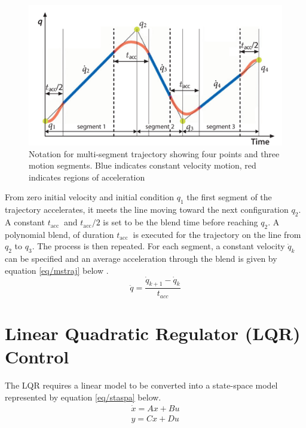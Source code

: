 \documentclass{UoNMCHA}
\numberwithin{equation}{section}
\begin{document}
	\begin{figure}[H]
		\begin{center}
			\includegraphics[width=.8\linewidth]{figs/Picture11}
			\caption{Notation for multi-segment trajectory showing four points and three motion segments. Blue indicates constant velocity motion, red indicates regions of acceleration \cite{corke_2017_robotics}}
			\label{figs/Picture11}
		\end{center}
	\end{figure}
	
	From zero initial velocity and initial condition $q_{1}$ the first segment of the trajectory accelerates, it meets
	the line moving toward the next configuration $q_{2}$. A constant $t_{\text {acc }}$ and $t_{\text {acc}} / 2$ is set to be the blend time
	before reaching $q_{2}$. A polynomial blend, of duration $t_{\text {acc }}$ is executed for the trajectory on the line from
	$q_{2}$ to $q_{3}$. The process is then repeated. For each segment, a constant velocity $\dot{q}_{k}$ can be specified and
	an average acceleration through the blend is given by equation \eqref{eq/mstraj} below \cite{corke_2017_robotics}.
\begin{equation} \label{eq/mstraj}
	\ddot{q}=\frac{\dot{q}_{k+1}-\dot{q}_{k}}{t_{a c c}}
\end{equation}
	
	\section{Linear Quadratic Regulator (LQR) Control}
	
	The LQR requires a linear model to be converted into a state-space model represented by equation \eqref{eq/staspa} below.\\
	\begin{equation}\label{eq/staspa}
\begin{array}{l}
	\dot{x}=A x+B u \\
	y=C x+D u
\end{array}
	\end{equation}\\
\end{document}
